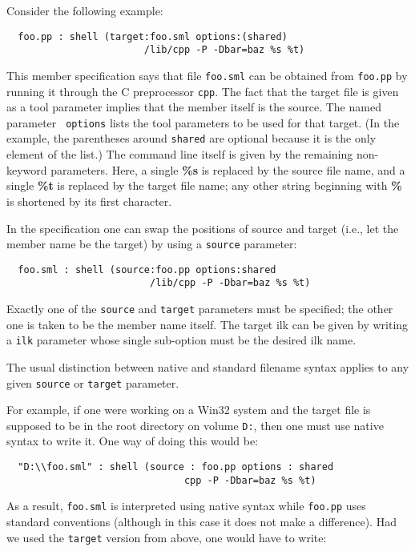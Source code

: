 Consider the following example:

\begin{verbatim}
  foo.pp : shell (target:foo.sml options:(shared)
                        /lib/cpp -P -Dbar=baz %s %t)
\end{verbatim}

This member specification says that file {\tt foo.sml} can be obtained
from {\tt foo.pp} by running it through the C preprocessor {\tt cpp}.
The fact that the target file is given as a tool parameter implies
that the member itself is the source.  The named parameter {\tt
options} lists the tool parameters to be used for that target. (In the
example, the parentheses around {\tt shared} are optional because it
is the only element of the list.) The command line itself is given by
the remaining non-keyword parameters.  Here, a single {\bf \%s} is
replaced by the source file name, and a single {\bf \%t} is replaced
by the target file name; any other string beginning with {\bf \%} is
shortened by its first character.

In the specification one can swap the positions of source and target
(i.e., let the member name be the target) by using a {\tt source}
parameter:

\begin{verbatim}
  foo.sml : shell (source:foo.pp options:shared
                         /lib/cpp -P -Dbar=baz %s %t)
\end{verbatim}

Exactly one of the {\tt source} and {\tt target} parameters must be
specified; the other one is taken to be the member name itself.  The
target ilk can be given by writing a {\tt ilk} parameter whose
single sub-option must be the desired ilk name.

The usual distinction between native and standard filename syntax
applies to any given {\tt source} or {\tt target} parameter.

For example, if one were working on a Win32 system and the target file
is supposed to be in the root directory on volume {\tt D:},
then one must use native syntax to write it.  One way of doing this
would be:

\begin{verbatim}
  "D:\\foo.sml" : shell (source : foo.pp options : shared
                               cpp -P -Dbar=baz %s %t)
\end{verbatim}

\noindent As a result, {\tt foo.sml} is interpreted using native
syntax while {\tt foo.pp} uses standard conventions (although in this
case it does not make a difference).  Had we used the {\tt target}
version from above, one would have to write:

